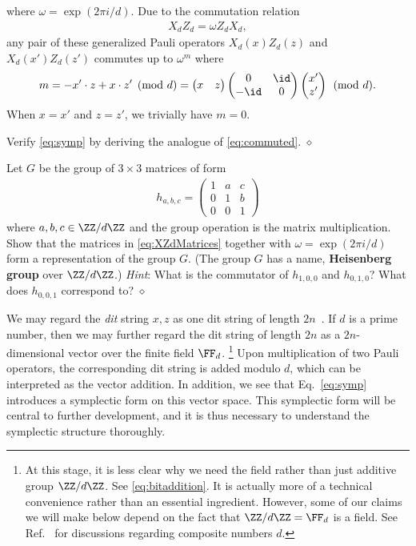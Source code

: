 where $\omega = \exp( 2\pi i / d)$.
Due to the commutation relation
\begin{align}
 X_d Z_d = \omega Z_d X_d ,
 \label{eq:XZdCommutation}
\end{align}
any pair of these generalized Pauli operators $X_d(x)Z_d(z)$ and $X_d(x') Z_d(z')$
commutes up to $\omega^m$ where
\begin{align}
 m = -x' \cdot z + x \cdot z'  \pmod d 
 = \begin{pmatrix} x & z \end{pmatrix}
 \begin{pmatrix} 0 & \id \\ -\id & 0 \end{pmatrix}
 \begin{pmatrix} x' \\ z' \end{pmatrix}
 \pmod d .
\label{eq:symp}
\end{align}
When $x=x'$ and $z=z'$, we trivially have $m = 0$.

\begin{exc}
Verify \eqref{eq:symp} by deriving the analogue of \eqref{eq:commuted}.
\hfill $\diamond$ \end{exc}

\begin{exc}
Let $G$ be the group of $3 \times 3$ matrices of form
\begin{align}
h_{a,b,c} = \begin{pmatrix}
1 & a & c \\ 0 & 1 & b \\ 0 & 0 & 1
\end{pmatrix}
\end{align}
where $a,b,c \in \ZZ/d\ZZ$ and the group operation is the matrix multiplication.
Show that the matrices in \eqref{eq:XZdMatrices} together with $\omega = \exp(2\pi i / d)$
form a representation of the group $G$.
(The group $G$ has a name, {\bf Heisenberg group} over $\ZZ/d\ZZ$.)
{\it Hint}: What is the commutator of $h_{1,0,0}$ and $h_{0,1,0}$?
What does $h_{0,0,1}$ correspond to?
\hfill $\diamond$ \end{exc}

We may regard the {\em dit} string $x,z$ 
as one dit string of length $2n$~\cite{Gottesman1999qudit,Rains1999Nonbinary}.
If $d$ is a prime number, then we may further regard the dit string of length $2n$ 
as a $2n$-dimensional vector over the finite field $\FF_d$.%
\footnote{At this stage, it is less clear why we need the field rather than just additive group $\ZZ / d\ZZ$.
See \eqref{eq:bitaddition}.
It is actually more of a technical convenience rather than an essential ingredient.
However, some of our claims we will make below depend on the fact that $\ZZ/d\ZZ = \FF_d$ is a field.
See Ref.~\cite{Farinholt2013} for discussions regarding composite numbers $d$.
}
Upon multiplication of two Pauli operators, the corresponding dit string is added modulo $d$,
which can be interpreted as the vector addition.
In addition, we see that Eq.~\eqref{eq:symp} introduces a symplectic form on this vector space.
This symplectic form will be central to further development,
and it is thus necessary to understand the symplectic structure thoroughly.

